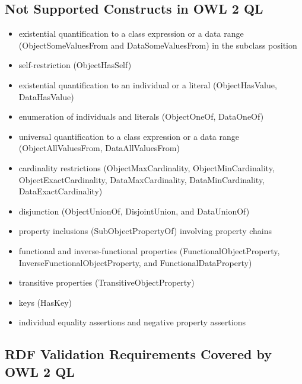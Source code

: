 \documentclass{llncs}
\begin{document}
\subsection{Not Supported Constructs in OWL 2 QL}

\begin{itemize}
	\item existential quantification to a class expression or a data range (ObjectSomeValuesFrom and DataSomeValuesFrom) in the subclass position
  \item self-restriction (ObjectHasSelf)
  \item existential quantification to an individual or a literal (ObjectHasValue, DataHasValue)
  \item enumeration of individuals and literals (ObjectOneOf, DataOneOf)
  \item universal quantification to a class expression or a data range (ObjectAllValuesFrom, DataAllValuesFrom)
  \item cardinality restrictions (ObjectMaxCardinality, ObjectMinCardinality, ObjectExactCardinality, DataMaxCardinality, DataMinCardinality, DataExactCardinality)
  \item disjunction (ObjectUnionOf, DisjointUnion, and DataUnionOf)
  \item property inclusions (SubObjectPropertyOf) involving property chains
  \item functional and inverse-functional properties (FunctionalObjectProperty, InverseFunctionalObjectProperty, and FunctionalDataProperty)
  \item transitive properties (TransitiveObjectProperty)
  \item keys (HasKey)
  \item individual equality assertions and negative property assertions
\end{itemize}

\subsection{RDF Validation Requirements Covered by OWL 2 QL}
\end{document}
